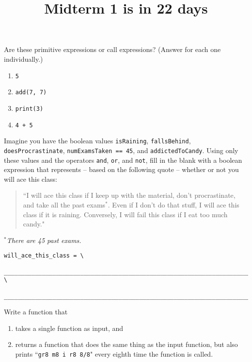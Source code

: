 \documentclass[twoside]{article}
\title{\sc Midterm 1 is in 22 days}
\begin{document}
\maketitle

\begin{enumerate}

Are these primitive expressions or call expressions? (Answer for each one individually.)
\begin{enumerate}
\item \texttt{5}
\item \texttt{add(7, 7)}
\item \texttt{print(3)}
\item \texttt{4 + 5}
\end{enumerate}


Imagine you have the boolean values \texttt{isRaining}, \texttt{fallsBehind}, \texttt{doesProcrastinate}, \texttt{numExamsTaken == 45}, and \texttt{addictedToCandy}. Using only these values and the operators \texttt{and}, \texttt{or}, and \texttt{not}, fill in the blank with a boolean expression that represents -- based on the following quote -- whether or not you will ace this class:

\begin{quote}
``I will ace this class if I keep up with the material, don't procrastinate, and take all the past exams$^*$. Even if I don't do that stuff, I will ace this class if it is raining. Conversely, I will fail this class if I eat too much candy."
\end{quote}

\hfill $^*$\textit{There are 45 past exams.}

\begin{lstlisting}
will_ace_this_class = \

________________________________________________________________________ \

__________________________________________________________________________
\end{lstlisting}


Write a function that
\begin{enumerate}
\item takes a single function as input, and
\item returns a function that does the same thing as the input function, but also prints ``\texttt{gr8 m8 i r8 8/8}" every eighth time the function is called.
\end{enumerate}


\end{enumerate}
\end{document}
